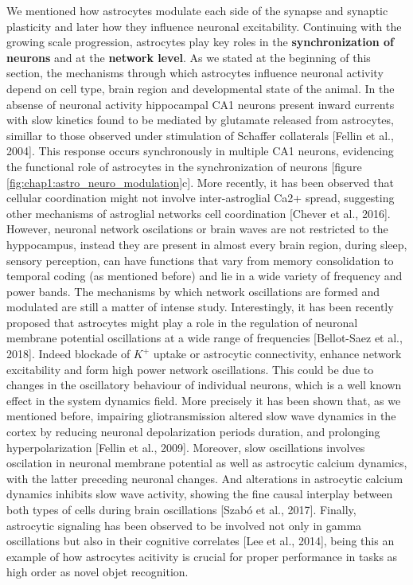 We mentioned how astrocytes modulate each side of the synapse and synaptic plasticity and later how they influence neuronal excitability. 
Continuing with the growing scale progression, astrocytes play key roles in the \textbf{synchronization of neurons} and at the \textbf{network level}.
As we stated at the beginning of this section, the mechanisms through which astrocytes influence neuronal activity depend on cell type, brain region and developmental state of the animal.
In the absense of neuronal activity hippocampal CA1 neurons present inward currents with slow kinetics found to be mediated by glutamate released from astrocytes, simillar to those observed under stimulation of Schaffer collaterals [Fellin et al., 2004].
This response occurs synchronously in multiple CA1 neurons, evidencing the functional role of astrocytes in the synchronization of neurons [figure \ref{fig:chap1:astro_neuro_modulation}c].
More recently, it has been observed that cellular coordination might not involve inter-astroglial Ca2+ spread, suggesting other mechanisms of astroglial networks cell coordination [Chever et al., 2016]. 
However, neuronal network oscilations or brain waves are not restricted to the hyppocampus, instead they are present in almost every brain region, during sleep, sensory perception, can have functions that vary from memory consolidation to temporal coding (as mentioned before) and lie in a wide variety of frequency and power bands.   
The mechanisms by which network oscillations are formed and modulated are still a matter of intense study.
Interestingly, it has been recently proposed that astrocytes might play a role in the regulation of neuronal membrane potential oscillations at a wide range of frequencies [Bellot-Saez et al., 2018].
Indeed blockade of $K^+$ uptake or astrocytic connectivity, enhance network excitability and form high power network oscillations.
This could be due to changes in the oscillatory behaviour of individual neurons, which is a well known effect in the system dynamics field.
More precisely it has been shown that, as we mentioned before, impairing gliotransmission altered slow wave dynamics in the cortex by reducing neuronal depolarization periods duration, and prolonging hyperpolarization [Fellin et al., 2009].
Moreover, slow oscillations involves oscilation in neuronal membrane potential as well as astrocytic calcium dynamics, with the latter preceding neuronal changes.  
And alterations in astrocytic calcium dynamics inhibits slow wave activity, showing the fine causal interplay between both types of cells during brain oscillations [Szabó et al., 2017].
Finally, astrocytic signaling has been observed to be involved not only in gamma oscillations but also in their cognitive correlates [Lee et al., 2014], being this an example of how astrocytes acitivity is crucial for proper performance in tasks as high order as novel objet recognition.

